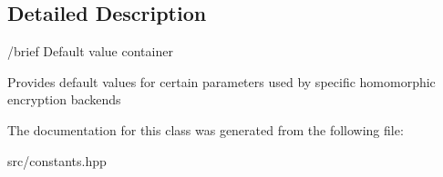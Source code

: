 \subsection{Detailed Description}
/brief Default value container

Provides default values for certain parameters used by specific homomorphic encryption backends 

The documentation for this class was generated from the following file\+:\begin{DoxyCompactItemize}
\item 
src/constants.\+hpp\end{DoxyCompactItemize}
